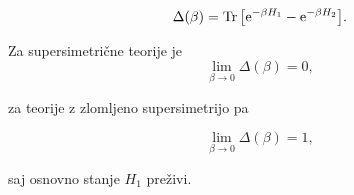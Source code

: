 \begin{equation}
	\Delta (\beta) = \operatorname{Tr}\big[\text{e}^{-\beta H_1} - \text{e}^{-\beta H_2}\big].
\end{equation}

\ni Za supersimetri\v cne teorije je 
\begin{equation}
	\lim_{\beta \to 0} \Delta(\beta) = 0,
\end{equation}

\ni za teorije z zlomljeno supersimetrijo pa 

\begin{equation}
	\lim_{\beta \to 0} \Delta (\beta) = 1,
\end{equation}

\ni saj osnovno stanje $H_1$ pre\v zivi.

